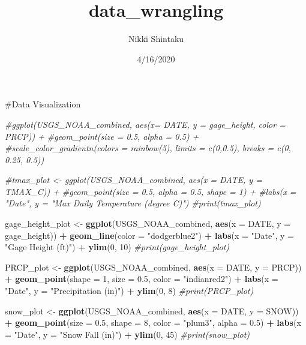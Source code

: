 \documentclass[]{article}
\title{data\_wrangling}
\author{Nikki Shintaku}
\date{4/16/2020}
\newenvironment{Shaded}{\begin{snugshade}}{\end{snugshade}}
\newcommand{\CommentTok}[1]{\textcolor[rgb]{0.56,0.35,0.01}{\textit{#1}}}
\newcommand{\DataTypeTok}[1]{\textcolor[rgb]{0.13,0.29,0.53}{#1}}
\newcommand{\DecValTok}[1]{\textcolor[rgb]{0.00,0.00,0.81}{#1}}
\newcommand{\FloatTok}[1]{\textcolor[rgb]{0.00,0.00,0.81}{#1}}
\newcommand{\KeywordTok}[1]{\textcolor[rgb]{0.13,0.29,0.53}{\textbf{#1}}}
\newcommand{\NormalTok}[1]{#1}
\newcommand{\OperatorTok}[1]{\textcolor[rgb]{0.81,0.36,0.00}{\textbf{#1}}}
\newcommand{\StringTok}[1]{\textcolor[rgb]{0.31,0.60,0.02}{#1}}
\begin{document}
\maketitle

\#Data Visualization

\begin{Shaded}
\begin{Highlighting}[]
\CommentTok{#ggplot(USGS_NOAA_combined, aes(x= DATE, y = gage_height, color = PRCP)) +}
  \CommentTok{#geom_point(size = 0.5, alpha = 0.5) +}
  \CommentTok{#scale_color_gradientn(colors = rainbow(5), limits = c(0,0.5), breaks = c(0, 0.25, 0.5))}

\CommentTok{#tmax_plot <- ggplot(USGS_NOAA_combined, aes(x = DATE, y = TMAX_C)) +}
  \CommentTok{#geom_point(size = 0.5, alpha = 0.5, shape = 1) +}
  \CommentTok{#labs(x = "Date", y = "Max Daily Temperature (degree C)")}
\CommentTok{#print(tmax_plot)}

\NormalTok{gage_height_plot <-}\StringTok{ }\KeywordTok{ggplot}\NormalTok{(USGS_NOAA_combined, }\KeywordTok{aes}\NormalTok{(}\DataTypeTok{x =}\NormalTok{ DATE, }\DataTypeTok{y =}\NormalTok{ gage_height)) }\OperatorTok{+}
\StringTok{  }\KeywordTok{geom_line}\NormalTok{(}\DataTypeTok{color =} \StringTok{"dodgerblue2"}\NormalTok{) }\OperatorTok{+}
\StringTok{  }\KeywordTok{labs}\NormalTok{(}\DataTypeTok{x =} \StringTok{"Date"}\NormalTok{, }\DataTypeTok{y =} \StringTok{"Gage Height (ft)"}\NormalTok{) }\OperatorTok{+}
\StringTok{  }\KeywordTok{ylim}\NormalTok{(}\DecValTok{0}\NormalTok{, }\DecValTok{10}\NormalTok{) }
\CommentTok{#print(gage_height_plot)}

\NormalTok{PRCP_plot <-}\StringTok{ }\KeywordTok{ggplot}\NormalTok{(USGS_NOAA_combined, }\KeywordTok{aes}\NormalTok{(}\DataTypeTok{x =}\NormalTok{ DATE, }\DataTypeTok{y =}\NormalTok{ PRCP)) }\OperatorTok{+}
\StringTok{  }\KeywordTok{geom_point}\NormalTok{(}\DataTypeTok{shape =} \DecValTok{1}\NormalTok{, }\DataTypeTok{size =} \FloatTok{0.5}\NormalTok{, }\DataTypeTok{color =} \StringTok{"indianred2"}\NormalTok{) }\OperatorTok{+}
\StringTok{  }\KeywordTok{labs}\NormalTok{(}\DataTypeTok{x =} \StringTok{"Date"}\NormalTok{, }\DataTypeTok{y =} \StringTok{"Precipitation (in)"}\NormalTok{) }\OperatorTok{+}
\StringTok{  }\KeywordTok{ylim}\NormalTok{(}\DecValTok{0}\NormalTok{, }\DecValTok{8}\NormalTok{)}
\CommentTok{#print(PRCP_plot)}

\NormalTok{snow_plot <-}\StringTok{ }\KeywordTok{ggplot}\NormalTok{(USGS_NOAA_combined, }\KeywordTok{aes}\NormalTok{(}\DataTypeTok{x =}\NormalTok{ DATE, }\DataTypeTok{y =}\NormalTok{ SNOW)) }\OperatorTok{+}
\StringTok{  }\KeywordTok{geom_point}\NormalTok{(}\DataTypeTok{size =} \FloatTok{0.5}\NormalTok{, }\DataTypeTok{shape =} \DecValTok{8}\NormalTok{, }\DataTypeTok{color =} \StringTok{"plum3"}\NormalTok{, }\DataTypeTok{alpha =} \FloatTok{0.5}\NormalTok{) }\OperatorTok{+}
\StringTok{  }\KeywordTok{labs}\NormalTok{(}\DataTypeTok{x =} \StringTok{"Date"}\NormalTok{, }\DataTypeTok{y =} \StringTok{"Snow Fall (in)"}\NormalTok{) }\OperatorTok{+}
\StringTok{  }\KeywordTok{ylim}\NormalTok{(}\DecValTok{0}\NormalTok{, }\DecValTok{45}\NormalTok{) }
\CommentTok{#print(snow_plot)}


\end{Highlighting}
\end{Shaded}
\end{document}
